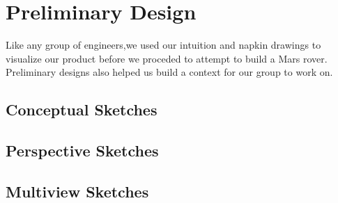 \chapter{Preliminary Design}
Like any group of engineers,we used our intuition and napkin drawings to visualize our product before we proceded to attempt to build a Mars rover.
Preliminary designs also helped us build a context for our group to work on.

\section{Conceptual Sketches}
 
\clearpage

\section{Perspective Sketches}
 
\clearpage

\section{Multiview Sketches}

